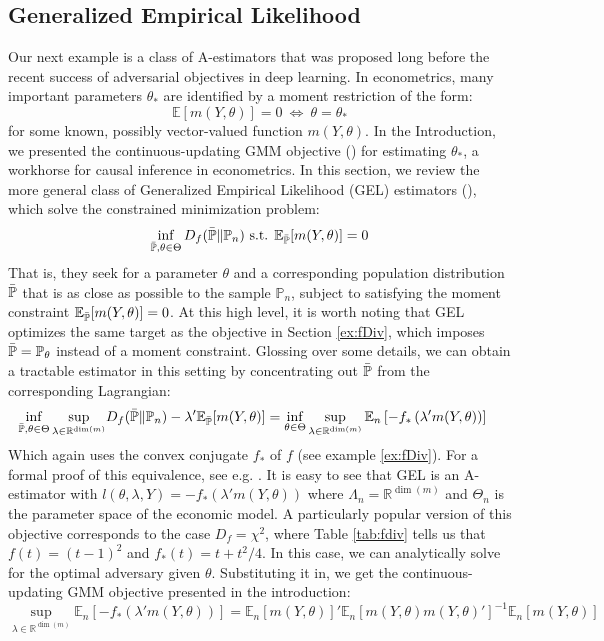 \documentclass[12pt]{article}
\theoremstyle{myplain}
\theoremstyle{definition}
\theoremstyle{definition}
\theoremstyle{remark}
\numberwithin{equation}{section}
\begin{document}
\subsection{Generalized Empirical Likelihood} \label{ex:GEL}
Our next example is a class of A-estimators that was proposed long before the recent success of adversarial objectives in deep learning. In econometrics, many important parameters $\theta_*$ are identified by a moment restriction of the form:
$$\mathbb{E}[m(Y, \theta)]=0 \ \iff \ \theta=\theta_*$$
for some known, possibly vector-valued function $m(Y,\theta)$. In the Introduction, we presented the continuous-updating GMM objective (\cite{CUEGMM}) for estimating $\theta_*$, a workhorse for causal inference in econometrics. In this section, we review the more general class of Generalized Empirical Likelihood (GEL) estimators (\cite{newey2004generalized}), which solve the constrained minimization problem:
$$\inf_{\Bar{\mathbb{P}},\theta\in\Theta} D_f(\Bar{\mathbb{P}}\|\mathbb{P}_n)  \text{ s.t. } \mathbb{E}_{\Bar{\mathbb{P}}}[m(Y,\theta)]=0$$
That is, they seek for a parameter $\theta$ and a corresponding population distribution $\Bar{\mathbb{P}}$ that is as close as possible to the sample $\mathbb{P}_n$, subject to satisfying the moment constraint $\mathbb{E}_{\Bar{\mathbb{P}}}[m(Y,\theta)]=0$. At this high level, it is worth noting that GEL optimizes the same target as the objective in Section \ref{ex:fDiv}, which imposes $\Bar{\mathbb{P}}=\mathbb{P}_\theta$ instead of a moment constraint. Glossing over some details, we can obtain a tractable estimator in this setting by concentrating out $\Bar{\mathbb{P}}$ from the corresponding Lagrangian:
\begin{align}
    \begin{split}\label{eq:gel}
        \inf_{\Bar{\mathbb{P}},\theta\in\Theta} \sup_{\lambda\in\mathbb{R}^{\operatorname{dim}(m)}} & D_f(\Bar{\mathbb{P}}\|\mathbb{P}_n) - \lambda'\mathbb{E}_{\Bar{\mathbb{P}}}[m(Y,\theta)] = \inf_{\theta\in\Theta} \sup_{\lambda\in\mathbb{R}^{\operatorname{dim}(m)}} \mathbb{E}_n\left[-f_*\left(\lambda'm(Y, \theta)\right)\right]
    \end{split}
\end{align}
Which again uses the convex conjugate $f_*$ of $f$ (see example \ref{ex:fDiv}). For a formal proof of this equivalence, see e.g. \cite{imbens1995gel}. It is easy to see that GEL is an A-estimator with $l(\theta, \lambda , Y)=-f_*(\lambda'm(Y, \theta))$ where $\Lambda_n=\mathbb{R}^{\operatorname{dim}(m)}$ and $\Theta_n$ is the parameter space of the economic model. A particularly popular version of this objective corresponds to the case $D_f=\chi^2$, where Table \ref{tab:fdiv} tells us that $f(t)=(t-1)^2$ and $f_*(t)=t+t^2/4$. In this case, we can analytically solve for the optimal adversary given $\theta$. Substituting it in, we get the continuous-updating GMM objective presented in the introduction:
$$\sup_{\lambda\in\mathbb{R}^{\operatorname{dim}(m)}} \mathbb{E}_n\left[-f_*\left(\lambda'm(Y, \theta)\right)\right] = \mathbb{E}_n\left[m(Y, \theta)\right]'\mathbb{E}_n\left[m(Y, \theta)m(Y, \theta)'\right]^{-1}\mathbb{E}_n\left[m(Y, \theta)\right]$$
\end{document}
